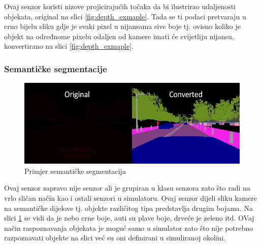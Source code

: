 Ovaj senzor koristi nizove projicirajućih točaka da bi ilustrirao udaljenosti objekata, original na slici \ref{fig:depth_exmaple}. Tada se ti podaci pretvaraju u crno bijelu sliku gdje je svaki pixel u nijansama sive boje tj. ovisno koliko je objekt na određnome pixelu odaljen od kamere imati će svijetliju nijansu, konvertirano na slici \ref{fig:depth_exmaple}.

\newpage
\subsubsection{Semantičke segmentacije}
\begin{figure}[ht!]
  \centering
  \includegraphics[scale=0.5]{images/sem_seg_exmaple.png}
  \caption{Primjer semantičke segmentacija}
  \label{fig:sem_seg_exmaple}
\end{figure}

Ovaj senzor zapravo nije senzor ali je grupiran u klasu senzora zato što radi na vrlo sličan način kao i ostali senzori u simulatoru. Ovaj senzor dijeli sliku kamere na semantičke dijelove tj. objekte različitog tipa predstavlja drugim bojama. Na slici \ref{fig:sem_seg_exmaple} se vidi da je nebo crne boje, auti su plave boje, drveće je zeleno itd. OVaj način raspoznavanja objekata je moguć samo u simulator zato što nije potrebno razpoznavati objekte na slici već su oni definirani u simuliranoj okolini.

